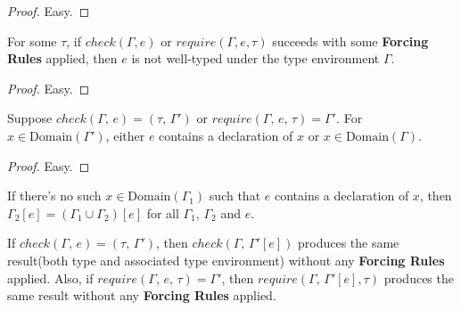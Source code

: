 \documentclass[peerreview, 10pt]{IEEEtran}
\newcommand{\checktype}[4]{\ensuremath{{check}(#1,\,#2)=(#3,\,#4)}}
\newcommand{\requiretype}[4]{\ensuremath{{require}(#1,\,#2,\,#3)=#4}}
\newcommand{\domain}[1]{\ensuremath{\text{Domain}(#1)}}
\begin{document}
\begin{proof}
    Easy.
\end{proof}

\begin{theorem}
    \label{thm:check-ill-typed}
    For some $\tau$, if $check(\Gamma, e)$ or $require(\Gamma, e, \tau)$ succeeds with some \textbf{Forcing Rules} applied, then $e$ is not well-typed under the type environment $\Gamma$.
\end{theorem}

\begin{proof}
    Easy.
\end{proof}

\begin{lemma}
    \label{lem:contains-declaration-or-tenv}
    Suppose \checktype{\Gamma}{e}{\tau}{\Gamma'} or \requiretype{\Gamma}{e}{\tau}{\Gamma'}. For $x \in\domain{\Gamma'}$, either $e$ contains a declaration of $x$ or $x\in\domain{\Gamma}$.
\end{lemma}

\begin{proof}
    Easy.
\end{proof}

\begin{lemma}
    \label{lem:apply-iden}
    If there's no such $x\in\domain{\Gamma_1}$ such that $e$ contains a declaration of $x$, then $\Gamma_2[e]=(\Gamma_1\cup\Gamma_2)[e]$ for all $\Gamma_1$, $\Gamma_2$ and $e$.
\end{lemma}

\begin{theorem}
    \label{thm:check-apply}
    If $\checktype{\Gamma}{e}{\tau}{\Gamma'}$, then $check(\Gamma,\,\Gamma'[e])$ produces the same result(both type and associated type environment) without any \textbf{Forcing Rules} applied. Also, if $\requiretype{\Gamma}{e}{\tau}{\Gamma'}$, then $require(\Gamma,\,\Gamma'[e], \tau)$ produces the same result without any \textbf{Forcing Rules} applied.
\end{theorem}
\end{document}
